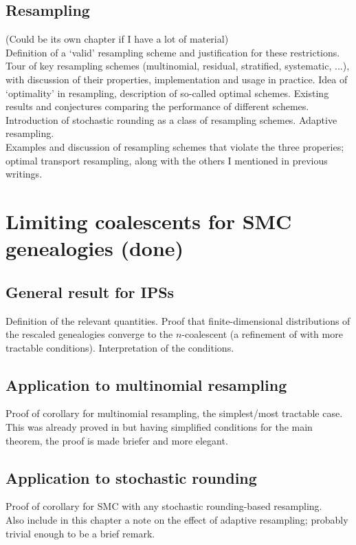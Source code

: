\documentclass{article}
\begin{document}
\subsection{Resampling} 
(Could be its own chapter if I have a lot of material)\\
Definition of a `valid' resampling scheme and justification for these restrictions. Tour of key resampling schemes (multinomial, residual, stratified, systematic, ...), with discussion of their properties, implementation and usage in practice. Idea of `optimality' in resampling, description of so-called optimal schemes. Existing results and conjectures comparing the performance of different schemes. Introduction of stochastic rounding as a class of resampling schemes. Adaptive resampling.\\
Examples and discussion of resampling schemes that violate the three properies; optimal transport resampling, along with the others I mentioned in previous writings.

\section{Limiting coalescents for SMC genealogies (done)}
\subsection{General result for IPSs}
Definition of the relevant quantities. Proof that finite-dimensional distributions of the rescaled genealogies converge to the $n$-coalescent (a refinement of \citet[Theorem 1]{koskela2018} with more tractable conditions). Interpretation of the conditions.
\subsection{Application to multinomial resampling}
Proof of corollary for multinomial resampling, the simplest/most tractable case. This was already proved in \citet{koskela2018} but having simplified conditions for the main theorem, the proof is made briefer and more elegant.
\subsection{Application to stochastic rounding}
Proof of corollary for SMC with any stochastic rounding-based resampling.\\
Also include in this chapter a note on the effect of adaptive resampling; probably trivial enough to be a brief remark.
\end{document}
